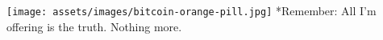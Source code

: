 \begin{center}
  \texttt{[image: assets/images/bitcoin-orange-pill.jpg]}
  *{Remember: All I'm offering is the truth. Nothing more.}
  \label{fig:bitcoin-orange-pill}
\end{center}

%
%
%
